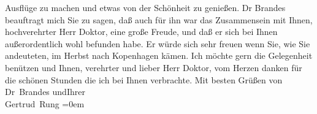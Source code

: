 \begin{ledgroupsized}[t]{13cm}
               Ausflüge zu machen und etwas von der Schönheit zu genießen.\pend
           \pstart
           Dr Brandes beauftragt mich Sie {\pb}zu
               sagen, daß auch für ihn war das Zusammensein mit Ihnen, hochverehrter Herr Doktor,
               eine große Freude, und daß er sich bei Ihnen außerordentlich wohl befunden habe. Er
               würde sich sehr freuen wenn Sie, wie Sie andeuteten, im Herbst nach Kopenhagen kämen.\pend
           \pstart
           Ich möchte gern die Gelegenheit benützen und Ihnen, verehrter und lieber Herr Doktor,
               vom Herzen danken für die schönen Stunden die ich bei Ihnen verbrachte.\pend
           \pstart
           Mit besten Grüßen von Dr Brandes
                  und\hspace*{2.5em}Ihrer{\\[\baselineskip]}\spacefill\mbox{Gertrud Rung}\pend
           \leftskip=0em{}
         
         \endnumbering{}\end{ledgroupsized}  \newcommand{\dateiname}{L02441}\newcommand{\titel}{Gertrud Rung an Arthur Schnitzler, 24. 5. 1925}\newcommand{\editorInnen}{Martin Anton Müller und Gerd-Hermann Susen}
      